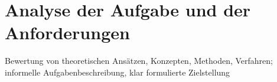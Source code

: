 \section{Analyse der Aufgabe und der Anforderungen}

Bewertung von theoretischen Ansätzen, Konzepten, Methoden, Verfahren; informelle Aufgabenbeschreibung, klar formulierte Zielstellung

\pagebreak